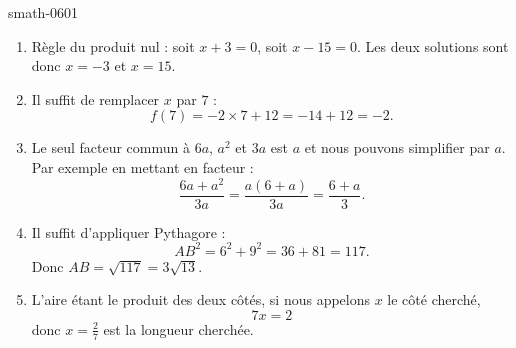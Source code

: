 
\begin{corrige}{smath-0601}

    \begin{enumerate}
        \item
    Règle du produit nul : soit \( x+3=0\), soit \( x-15=0\). Les deux solutions sont donc \( x=-3\) et \( x=15\).
\item
    Il suffit de remplacer \( x\) par \( 7\) :
    \begin{equation}
        f(7)=-2\times 7+12=-14+12=-2.
    \end{equation}
\item
    Le seul facteur commun à \( 6a\), \( a^2\) et \( 3a\) est \( a\) et nous pouvons simplifier par \( a\). Par exemple en mettant en facteur :
    \begin{equation}
        \frac{ 6a+a^2 }{ 3a }=\frac{ a(6+a) }{ 3a }=\frac{ 6+a }{ 3 }.
    \end{equation}
\item
    Il suffit d'appliquer Pythagore :
    \begin{equation}
        AB^2=6^2+9^2=36+81=117.
    \end{equation}
    Donc \( AB=\sqrt{117}=3\sqrt{13}\).
\item
    L'aire étant le produit des deux côtés, si nous appelons \( x\) le côté cherché,
    \begin{equation}
        7x=2
    \end{equation}
    donc \( x=\frac{ 2 }{ 7 }\) est la longueur cherchée.
            
    \end{enumerate}

\end{corrige}
